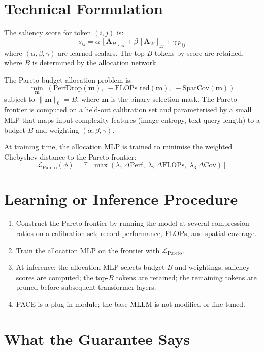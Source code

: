 \documentclass[10pt,twocolumn]{article}
\begin{document}
\section{Technical Formulation}

The saliency score for token $(i,j)$ is:
\[
s_{ij} = \alpha\,[\mathbf{A}_H]_{ii} + \beta\,[\mathbf{A}_W]_{jj} + \gamma\, p_{ij}
\]
where $(\alpha, \beta, \gamma)$ are learned scalars. The top-$B$ tokens by
score are retained, where $B$ is determined by the allocation network.

The Pareto budget allocation problem is:
\[
\min_{\mathbf{m}}\;\left(\text{PerfDrop}(\mathbf{m}),\;
  -\text{FLOPs\_red}(\mathbf{m}),\;
  -\text{SpatCov}(\mathbf{m})\right)
\]
subject to $\|\mathbf{m}\|_0 = B$, where $\mathbf{m}$ is the binary
selection mask. The Pareto frontier is computed on a held-out calibration
set and parameterised by a small MLP that maps input complexity features
(image entropy, text query length) to a budget $B$ and weighting
$(\alpha, \beta, \gamma)$.

At training time, the allocation MLP is trained to minimise the weighted
Chebyshev distance to the Pareto frontier:
\[
\mathcal{L}_{\text{Pareto}}(\phi) = \mathbb{E}\!\left[
  \max\!\left(\lambda_1\, \Delta\text{Perf},\;
    \lambda_2\, \Delta\text{FLOPs},\;
    \lambda_3\, \Delta\text{Cov}\right)\right]
\]

\section{Learning or Inference Procedure}

\begin{enumerate}[itemsep=2pt,parsep=0pt]
  \item Construct the Pareto frontier by running the model at several
    compression ratios on a calibration set; record performance, FLOPs,
    and spatial coverage.
  \item Train the allocation MLP on the frontier with $\mathcal{L}_{\text{Pareto}}$.
  \item At inference: the allocation MLP selects budget $B$ and weightings;
    saliency scores are computed; the top-$B$ tokens are retained; the
    remaining tokens are pruned before subsequent transformer layers.
  \item PACE is a plug-in module; the base MLLM is not modified or
    fine-tuned.
\end{enumerate}

\section{What the Guarantee Says}
\end{document}
